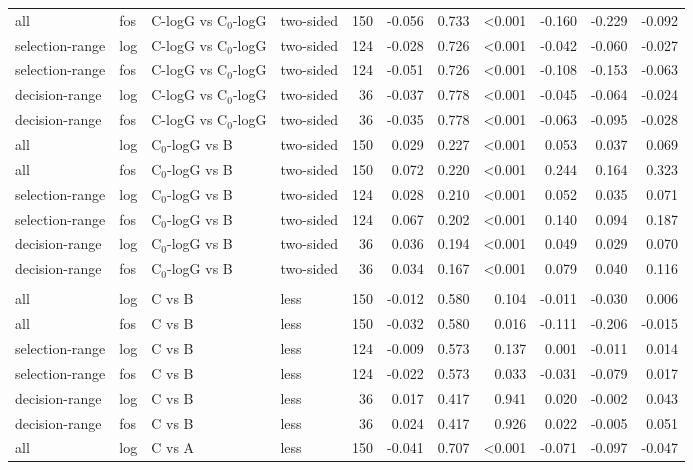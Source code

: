 \begin{longtable}{llllrrrrrrr}
all & fos & C-logG vs C$_0$-logG & two-sided & 150 & -0.056 & 0.733 & <0.001 & -0.160 & -0.229 & -0.092 \\
selection-range & log & C-logG vs C$_0$-logG & two-sided & 124 & -0.028 & 0.726 & <0.001 & -0.042 & -0.060 & -0.027 \\
selection-range & fos & C-logG vs C$_0$-logG & two-sided & 124 & -0.051 & 0.726 & <0.001 & -0.108 & -0.153 & -0.063 \\
decision-range & log & C-logG vs C$_0$-logG & two-sided & 36 & -0.037 & 0.778 & <0.001 & -0.045 & -0.064 & -0.024 \\
decision-range & fos & C-logG vs C$_0$-logG & two-sided & 36 & -0.035 & 0.778 & <0.001 & -0.063 & -0.095 & -0.028 \\
all & log & C$_0$-logG vs B & two-sided & 150 & 0.029 & 0.227 & <0.001 & 0.053 & 0.037 & 0.069 \\
all & fos & C$_0$-logG vs B & two-sided & 150 & 0.072 & 0.220 & <0.001 & 0.244 & 0.164 & 0.323 \\
selection-range & log & C$_0$-logG vs B & two-sided & 124 & 0.028 & 0.210 & <0.001 & 0.052 & 0.035 & 0.071 \\
selection-range & fos & C$_0$-logG vs B & two-sided & 124 & 0.067 & 0.202 & <0.001 & 0.140 & 0.094 & 0.187 \\
decision-range & log & C$_0$-logG vs B & two-sided & 36 & 0.036 & 0.194 & <0.001 & 0.049 & 0.029 & 0.070 \\
decision-range & fos & C$_0$-logG vs B & two-sided & 36 & 0.034 & 0.167 & <0.001 & 0.079 & 0.040 & 0.116 \\
\addlinespace
\multicolumn{11}{l}{\textit{RF}} \\
all & log & C vs B & less & 150 & -0.012 & 0.580 & 0.104 & -0.011 & -0.030 & 0.006 \\
all & fos & C vs B & less & 150 & -0.032 & 0.580 & 0.016 & -0.111 & -0.206 & -0.015 \\
selection-range & log & C vs B & less & 124 & -0.009 & 0.573 & 0.137 & 0.001 & -0.011 & 0.014 \\
selection-range & fos & C vs B & less & 124 & -0.022 & 0.573 & 0.033 & -0.031 & -0.079 & 0.017 \\
decision-range & log & C vs B & less & 36 & 0.017 & 0.417 & 0.941 & 0.020 & -0.002 & 0.043 \\
decision-range & fos & C vs B & less & 36 & 0.024 & 0.417 & 0.926 & 0.022 & -0.005 & 0.051 \\
all & log & C vs A & less & 150 & -0.041 & 0.707 & <0.001 & -0.071 & -0.097 & -0.047 \\

\end{longtable}
